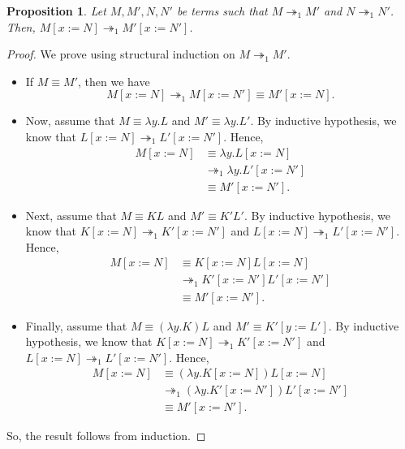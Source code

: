 \documentclass[a4paper, openany]{memoir}
\newtheorem{proposition}{Proposition}[section]
\theoremstyle{definition}
\begin{document}
    \begin{proposition}
        Let $M, M', N, N'$ be terms such that $M \twoheadrightarrow_1 M'$ and $N \twoheadrightarrow_1 N'$. Then, $M[x := N] \twoheadrightarrow_1 M'[x := N']$.
    \end{proposition}
    \begin{proof}
        We prove using structural induction on $M \twoheadrightarrow_1 M'$.
        \begin{itemize}
            \item If $M \equiv M'$, then we have
            \[M[x := N] \twoheadrightarrow_1 M[x := N'] \equiv M'[x := N].\]

            \item Now, assume that $M \equiv \lambda y.L$ and $M' \equiv \lambda y.L'$. By inductive hypothesis, we know that $L[x := N] \twoheadrightarrow_1 L'[x := N']$. Hence,
            \begin{align*}
                M[x := N] &\equiv \lambda y.L[x := N] \\
                &\twoheadrightarrow_1 \lambda y.L'[x := N'] \\
                &\equiv M'[x := N'].
            \end{align*}

            \item Next, assume that $M \equiv KL$ and $M' \equiv K'L'$. By inductive hypothesis, we know that $K[x := N] \twoheadrightarrow_1 K'[x := N']$ and $L[x := N] \twoheadrightarrow_1 L'[x := N']$. Hence,
            \begin{align*}
                M[x := N] &\equiv K[x := N] L[x := N] \\
                &\twoheadrightarrow_1 K'[x := N'] L'[x := N'] \\
                &\equiv M'[x := N'].
            \end{align*}

            \item Finally, assume that $M \equiv (\lambda y.K)L$ and $M' \equiv K'[y := L']$. By inductive hypothesis, we know that $K[x := N] \twoheadrightarrow_1 K'[x := N']$ and $L[x := N] \twoheadrightarrow_1 L'[x := N']$. Hence,
            \begin{align*}
                M[x := N] &\equiv (\lambda y.K[x := N])L[x := N] \\
                &\twoheadrightarrow_1 (\lambda y.K'[x := N'])L'[x := N'] \\
                &\equiv M'[x := N'].
            \end{align*}
        \end{itemize}
        So, the result follows from induction.
    \end{proof}
\end{document}
